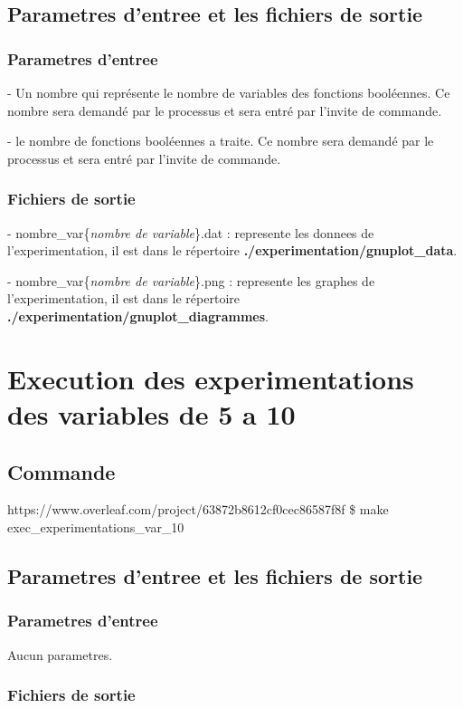 \documentclass{article}
\begin{document}
\subsection{Parametres d'entree et les fichiers de sortie}
\subsubsection{Parametres d'entree}
\tabto{1cm}- Un nombre qui représente le nombre de variables des fonctions booléennes. Ce nombre sera demandé par le processus et sera entré par l'invite de commande.

\tabto{1cm}- le nombre  de fonctions booléennes a traite. Ce nombre sera demandé par le processus et sera entré par l'invite de commande.

\subsubsection{Fichiers de sortie}

\tabto{1cm} -  nombre\_var\{\textit{nombre de variable}\}.dat : represente les donnees de l'experimentation, il est dans le répertoire \textbf{./experimentation/gnuplot\_data}.

\tabto{1cm} -  nombre\_var\{\textit{nombre de variable}\}.png : represente les graphes de l'experimentation, il est dans le répertoire \textbf{./experimentation/gnuplot\_diagrammes}.

\section{Execution des experimentations des variables de 5 a 10}

\subsection{Commande}https://www.overleaf.com/project/63872b8612cf0cec86587f8f
\tabto{1cm}\$ make exec\_experimentations\_var\_10

\subsection{Parametres d'entree et les fichiers de sortie}
\subsubsection{Parametres d'entree}
\tabto{1cm}Aucun parametres.

\subsubsection{Fichiers de sortie}
\end{document}

